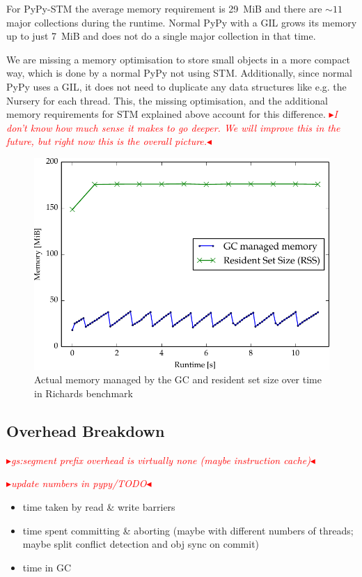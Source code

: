 \documentclass{sigplanconf}
\newcommand{\mynote}[2]{%
  \textcolor{red}{%
    \fbox{\bfseries\sffamily\scriptsize#1}%
    {\small$\blacktriangleright$\textsf{\emph{#2}}$\blacktriangleleft$}%
  }%
}
\newcommand\remi[1]{\mynote{Remi}{#1}}
\begin{document}
For PyPy-STM the average memory requirement is 29~MiB and there are
$\sim 11$ major collections during the runtime. Normal PyPy with a GIL
grows its memory up to just 7~MiB and does not do a single major
collection in that time.

We are missing a memory optimisation to store small objects in a more
compact way, which is done by a normal PyPy not using STM.
Additionally, since normal PyPy uses a GIL, it does not need to
duplicate any data structures like e.g. the Nursery for each
thread. This, the missing optimisation, and the additional memory
requirements for STM explained above account for this difference.
\remi{I don't know how much sense it makes to go deeper. We will
improve this in the future, but right now this is the overall picture.}

\begin{figure}[h]
  \centering
  \includegraphics[width=1\columnwidth]{plots/richards_mem.pdf}
  \caption{Actual memory managed by the GC and resident set size
    over time in Richards benchmark\label{fig:richards_mem}}
\end{figure}


\subsection{Overhead Breakdown}

\remi{gs:segment prefix overhead is virtually none (maybe instruction cache)}
\remi{update numbers in pypy/TODO}

\begin{itemize}
\item time taken by read \& write barriers
\item time spent committing \& aborting (maybe with different numbers
  of threads; maybe split conflict detection and obj sync on commit)
\item time in GC
\end{itemize}
\end{document}

